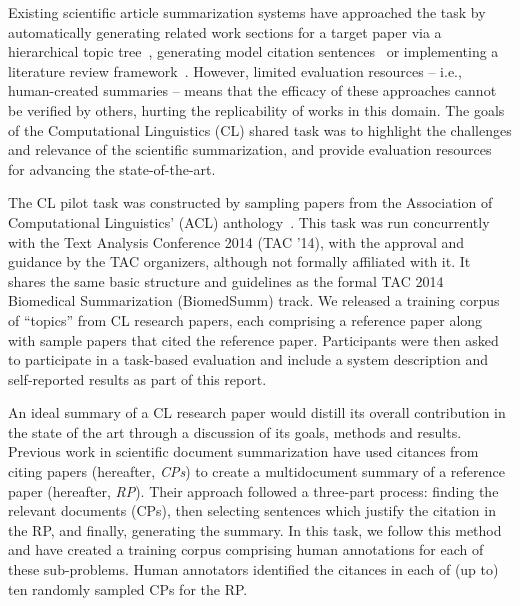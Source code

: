 \documentclass[11pt]{article}
\begin{document}
Existing scientific article summarization systems have approached the
task by automatically generating related work sections for a target
paper via a hierarchical topic tree~\cite{hoang2010towards},
generating model citation sentences~\cite{mohammad2009} or
implementing a literature review
framework~\cite{jaidka2013deconstructing}.  However, limited
evaluation resources -- i.e., human-created summaries -- means that
the efficacy of these approaches cannot be verified by others, hurting
the replicability of works in this domain. The goals of the
Computational Linguistics (CL) shared task was to highlight the
challenges and relevance of the scientific summarization, and provide
evaluation resources for advancing the state-of-the-art.

The CL pilot task was constructed by sampling papers from the
Association of Computational Linguistics' (ACL)
anthology~\cite{bird2008}.  This task was run concurrently with the
Text Analysis Conference 2014 (TAC '14), with the approval and
guidance by the TAC organizers, although not formally affiliated with
it.  It shares the same basic structure and guidelines as the formal
TAC 2014 Biomedical Summarization (BiomedSumm) track. We released a
training corpus of ``topics'' from CL research papers, each comprising
a reference paper along with sample papers that cited the reference
paper. Participants were then asked to participate in a task-based
evaluation and include a system description and self-reported results
as part of this report.


An ideal summary of a CL research paper would distill its overall
contribution in the state of the art through a discussion of its
goals, methods and results.  Previous work \cite{mohammad2009,abu2011}
in scientific document summarization have used citances from citing
papers (hereafter, {\it CPs}) to create a multidocument summary of a
reference paper (hereafter, {\it RP}). Their approach followed a
three-part process: finding the relevant documents (CPs), then
selecting sentences which justify the citation in the RP, and finally,
generating the summary. In this task, we follow this method and have
created a training corpus comprising human annotations for each of
these sub-problems. Human annotators identified the citances in each
of (up to) ten randomly sampled CPs for the RP.
\end{document}
